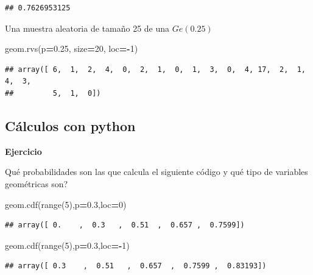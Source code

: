 \documentclass[]{book}
\newenvironment{Shaded}{\begin{snugshade}}{\end{snugshade}}
\newcommand{\BuiltInTok}[1]{#1}
\newcommand{\DecValTok}[1]{\textcolor[rgb]{0.00,0.00,0.81}{#1}}
\newcommand{\FloatTok}[1]{\textcolor[rgb]{0.00,0.00,0.81}{#1}}
\newcommand{\NormalTok}[1]{#1}
\newcommand{\OperatorTok}[1]{\textcolor[rgb]{0.81,0.36,0.00}{\textbf{#1}}}
\begin{document}
\begin{verbatim}
## 0.7626953125
\end{verbatim}

Una muestra aleatoria de tamaño 25 de una \(Ge(0.25)\)

\begin{Shaded}
\begin{Highlighting}[]
\NormalTok{geom.rvs(p}\OperatorTok{=}\FloatTok{0.25}\NormalTok{, size}\OperatorTok{=}\DecValTok{20}\NormalTok{, loc}\OperatorTok{=-}\DecValTok{1}\NormalTok{)}
\end{Highlighting}
\end{Shaded}

\begin{verbatim}
## array([ 6,  1,  2,  4,  0,  2,  1,  0,  1,  3,  0,  4, 17,  2,  1,  4,  3,
##         5,  1,  0])
\end{verbatim}

\hypertarget{cuxe1lculos-con-python-4}{%
\subsection{Cálculos con python}\label{cuxe1lculos-con-python-4}}

\textbf{Ejercicio}

Qué probabilidades son las que calcula el siguiente código y qué tipo de variables geométricas son?

\begin{Shaded}
\begin{Highlighting}[]
\NormalTok{geom.cdf(}\BuiltInTok{range}\NormalTok{(}\DecValTok{5}\NormalTok{),p}\OperatorTok{=}\FloatTok{0.3}\NormalTok{,loc}\OperatorTok{=}\DecValTok{0}\NormalTok{)}
\end{Highlighting}
\end{Shaded}

\begin{verbatim}
## array([ 0.    ,  0.3   ,  0.51  ,  0.657 ,  0.7599])
\end{verbatim}

\begin{Shaded}
\begin{Highlighting}[]
\NormalTok{geom.cdf(}\BuiltInTok{range}\NormalTok{(}\DecValTok{5}\NormalTok{),p}\OperatorTok{=}\FloatTok{0.3}\NormalTok{,loc}\OperatorTok{=-}\DecValTok{1}\NormalTok{)}
\end{Highlighting}
\end{Shaded}

\begin{verbatim}
## array([ 0.3    ,  0.51   ,  0.657  ,  0.7599 ,  0.83193])
\end{verbatim}
\end{document}
